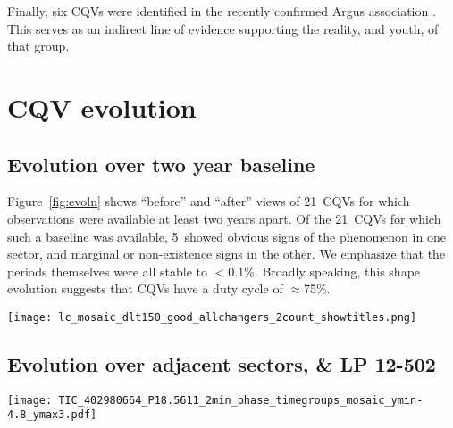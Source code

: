 \documentclass[11pt,twocolumn,tighten]{aastex63}
\newcommand{\ntwoyear}{21} %
\newcommand{\ntwoyearturnedoff}{5} %
\begin{document}
Finally, six CQVs were identified in the recently confirmed Argus
association \citep{2019ApJ...870...27Z}.  This serves as an indirect
line of evidence supporting the reality, and youth, of that group.


\section{CQV evolution}

\subsection{Evolution over two year baseline}

Figure~\ref{fig:evoln} shows ``before'' and ``after'' views
of \ntwoyear\ CQVs for which observations were available at least two years
apart.
Of the \ntwoyear\ CQVs for which such a baseline was available,
\ntwoyearturnedoff\ showed obvious signs of the phenomenon in one sector,
and marginal or non-existence signs in the other.
We emphasize that the periods themselves were all stable to $<$0.1\%.
Broadly speaking, this shape evolution
suggests that CQVs have a duty cycle of $\approx$75\%.


\begin{figure*}[!t]
	\begin{center}
		\centering
		\texttt{[image: lc\_mosaic\_dlt150\_good\_allchangers\_2count\_showtitles.png]}
		\vspace{-0.2cm}
		\caption{
			{\bf Evolution of CQVs}: ``Before and
			after'...  Panels
			in the top two rows are separated by two years
			($\approx$$10^3$ cycles); each panel shows one month.
			Periods are listed in hours. 
			{\bf todo: fix the plot and the caption.}
		}
		\label{fig:evoln}
	\end{center}
\end{figure*}




\subsection{Evolution over adjacent sectors, \& LP 12-502}
\begin{figure*}[!t]
	\begin{center}
		\centering
		\texttt{[image: TIC\_402980664\_P18.5611\_2min\_phase\_timegroups\_mosaic\_ymin-4.8\_ymax3.pdf]}
		\vspace{-0.45cm}
		\caption{
			Evolution of LP 12-502 ($P$=18.6\,h) at fixed period and
			epoch over three years. 
			Each panel shows one (stacked) TESS orbit; small text denotes relative cycle number.
			There are 200 binned black points per cycle.
			The TESS pointing law dictates time gaps; larger gaps tend to
			yield larger shape changes.
			The dips usually evolve over tens to hundreds of cycles.
			However cycles 1233-1264 show a dip that ``switched'' from a depth
			and duration of 3\% and 3\,hr to 0.3\% and 1\,hr over less than
			one cycle.
		}
		\label{fig:lp}
	\end{center}


\end{figure*}
\end{document}
